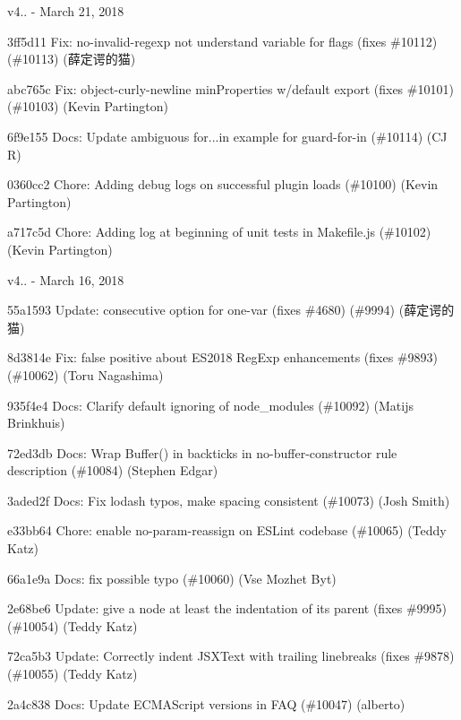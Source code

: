 v4.. -\/ March 21, 2018


\begin{DoxyItemize}
\item 3ff5d11 Fix\+: no-\/invalid-\/regexp not understand variable for flags (fixes \#10112) (\#10113) (薛定谔的猫)
\item abc765c Fix\+: object-\/curly-\/newline min\+Properties w/default export (fixes \#10101) (\#10103) (Kevin Partington)
\item 6f9e155 Docs\+: Update ambiguous for...in example for guard-\/for-\/in (\#10114) (CJ R)
\item 0360cc2 Chore\+: Adding debug logs on successful plugin loads (\#10100) (Kevin Partington)
\item a717c5d Chore\+: Adding log at beginning of unit tests in Makefile.\+js (\#10102) (Kevin Partington)
\end{DoxyItemize}

v4.. -\/ March 16, 2018


\begin{DoxyItemize}
\item 55a1593 Update\+: consecutive option for one-\/var (fixes \#4680) (\#9994) (薛定谔的猫)
\item 8d3814e Fix\+: false positive about ES2018 Reg\+Exp enhancements (fixes \#9893) (\#10062) (Toru Nagashima)
\item 935f4e4 Docs\+: Clarify default ignoring of node\+\_\+modules (\#10092) (Matijs Brinkhuis)
\item 72ed3db Docs\+: Wrap {\ttfamily Buffer()} in backticks in {\ttfamily no-\/buffer-\/constructor} rule description (\#10084) (Stephen Edgar)
\item 3aded2f Docs\+: Fix lodash typos, make spacing consistent (\#10073) (Josh Smith)
\item e33bb64 Chore\+: enable no-\/param-\/reassign on ESLint codebase (\#10065) (Teddy Katz)
\item 66a1e9a Docs\+: fix possible typo (\#10060) (Vse Mozhet Byt)
\item 2e68be6 Update\+: give a node at least the indentation of its parent (fixes \#9995) (\#10054) (Teddy Katz)
\item 72ca5b3 Update\+: Correctly indent JSXText with trailing linebreaks (fixes \#9878) (\#10055) (Teddy Katz)
\item 2a4c838 Docs\+: Update ECMAScript versions in FAQ (\#10047) (alberto)
\end{DoxyItemize}

